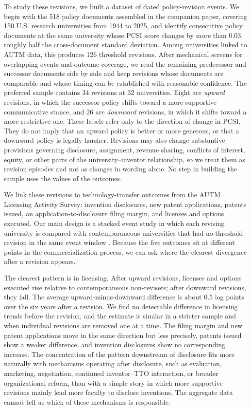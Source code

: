 To study these revisions, we built a dataset of dated policy-revision events. We begin with the 518 policy documents assembled in the companion paper, covering 150 U.S. research universities from 1944 to 2025, and identify consecutive policy documents at the same university whose PCSI score changes by more than 0.03, roughly half the cross-document standard deviation. Among universities linked to AUTM data, this produces 126 threshold revisions. After mechanical screens for overlapping events and outcome coverage, we read the remaining predecessor and successor documents side by side and keep revisions whose documents are comparable and whose timing can be established with reasonable confidence. The preferred sample contains 34 revisions at 32 universities. Eight are \emph{upward} revisions, in which the successor policy shifts toward a more supportive communicative stance, and 26 are \emph{downward} revisions, in which it shifts toward a more restrictive one. These labels refer only to the direction of change in PCSI. They do not imply that an upward policy is better or more generous, or that a downward policy is legally harsher. Revisions may also change substantive provisions governing disclosure, assignment, revenue sharing, conflicts of interest, equity, or other parts of the university--inventor relationship, so we treat them as revision episodes and not as changes in wording alone. No step in building the sample uses the values of the outcomes.

We link these revisions to technology-transfer outcomes from the AUTM Licensing Activity Survey: invention disclosures, new patent applications, patents issued, an application-to-disclosure filing margin, and licenses and options executed. Our main design is a stacked event study in which each revising university is compared with contemporaneous universities that had no threshold revision in the same event window \citep{CengizEtAl2019,BakerLarckerWang2022}. Because the five outcomes sit at different points in the commercialization process, we can ask where the clearest divergence after a revision appears.

The clearest pattern is in licensing. After upward revisions, licenses and options executed rise relative to contemporaneous non-revisers; after downward revisions, they fall. The average upward-minus-downward difference is about 0.5 log points over the six years after a revision. We find no detectable difference in licensing trends before the revision, and the estimate is similar in a stricter sample and when individual revisions are removed one at a time. The filing margin and new patent applications move in the same direction but less precisely, patents issued show a weaker difference, and invention disclosures show no corresponding increase. The concentration of the pattern downstream of disclosure fits more naturally with mechanisms operating after disclosure, such as evaluation, marketing, negotiation, continued inventor--TTO interaction, or broader organizational reform, than with a simple story in which more supportive revisions mainly lead more faculty to disclose inventions. The aggregate data cannot tell us which of these mechanisms is responsible.

